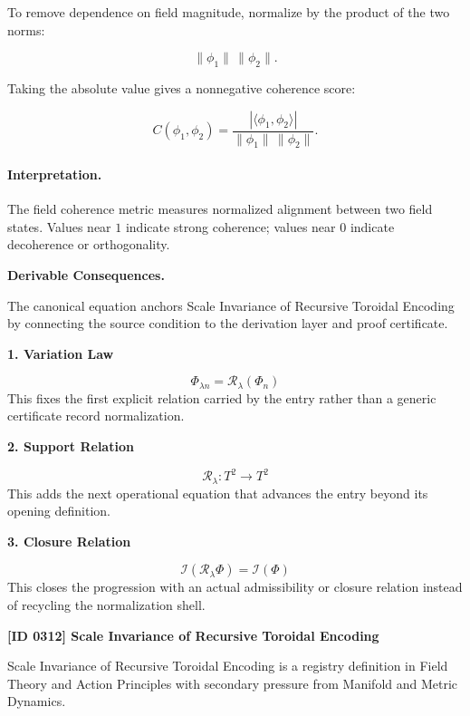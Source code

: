 To remove dependence on field magnitude, normalize by the product of the two norms:

\begin{equation}
\lVert \phi_1\rVert\,\lVert \phi_2\rVert .
\end{equation}

Taking the absolute value gives a nonnegative coherence score:

\begin{equation}
\boxed{
C(\phi_1,\phi_2)
=
\frac{
\left|\langle \phi_1,\phi_2\rangle\right|
}{
\lVert \phi_1\rVert\,\lVert \phi_2\rVert
}.
}
\end{equation}

\paragraph{Interpretation.}
The field coherence metric measures normalized alignment between two field states. Values near $1$ indicate strong coherence; values near $0$ indicate decoherence or orthogonality.

\par\vspace{0.35em}
\noindent\textbf{Derivable Consequences.}\quad
\begingroup
\footnotesize
\raggedright
The canonical equation anchors Scale Invariance of Recursive Toroidal Encoding by connecting the source condition to the derivation layer and proof certificate.
\par\endgroup

\noindent\textbf{1. Variation Law}\par
\[
\Phi_{\lambda n}=\mathcal{R}_{\lambda}\!\left(\Phi_{n}\right)
\]
\noindent This fixes the first explicit relation carried by the entry rather than a generic certificate record normalization.\par
\noindent\textbf{2. Support Relation}\par
\[
\mathcal{R}_{\lambda}:T^{2}\longrightarrow T^{2}
\]
\noindent This adds the next operational equation that advances the entry beyond its opening definition.\par
\noindent\textbf{3. Closure Relation}\par
\[
\mathcal{I}\!\left(\mathcal{R}_{\lambda}\Phi\right)=\mathcal{I}(\Phi)
\]
\noindent This closes the progression with an actual admissibility or closure relation instead of recycling the normalization shell.\par

\clearpage
\noindent\textbf{[ID 0312] Scale Invariance of Recursive Toroidal Encoding}\par
\vspace{0.35em}
\begingroup\small
{}
Scale Invariance of Recursive Toroidal Encoding is a registry definition in Field Theory and Action Principles with secondary pressure from Manifold and Metric Dynamics.

